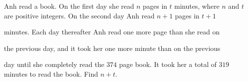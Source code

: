 Anh read a book. On the first day she read $n$ pages in $t$ minutes, where $n$ and $t$ are positive integers. On the second day Anh read $n + 1$ pages in $t + 1$

 minutes. Each day thereafter Anh read one more page than she read on 

the previous day, and it took her one more minute than on the previous 

day until she completely read the $374$ page book. It took her a total of $319$ minutes to read the book. Find $n + t$.